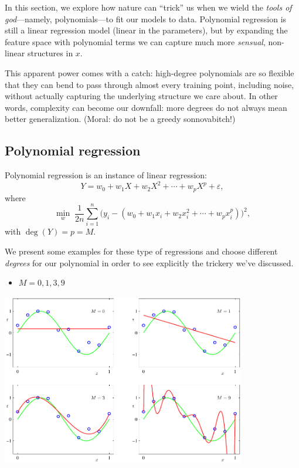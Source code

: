 In this section, we explore how nature can ``trick'' us when we wield the
\textit{tools of god}---namely, polynomials---to fit our models to data.
Polynomial regression is still a linear regression model (linear in the
parameters), but by expanding the feature space with polynomial terms we can
capture much more \textit{sensual}, non-linear structures in $x$.

\vspace{0.2cm}

This apparent power comes with a catch: high-degree polynomials are so
flexible that they can bend to pass through almost every training point,
including noise, without actually capturing the underlying structure we care
about. In other words, complexity can become our downfall: more degrees do not
always mean better generalization. (Moral: do not be a greedy sonnovabitch!)

\subsection*{Polynomial regression}
Polynomial regression is an instance of linear regression:
\[
Y = w_0 + w_1 X + w_2 X^2 + \cdots + w_p X^p + \varepsilon,
\]
where
\[
\min_{w}\;\frac{1}{2n}\sum_{i=1}^n \Big( y_i - (w_0 + w_1 x_i + w_2 x_i^2 + \cdots + w_p x_i^p) \Big)^2,
\]
with $\operatorname{deg}(Y) = p = M$.

\medskip

\noindent We present some examples for these type of regressions and choose different \textit{degrees} for our polynomial in order to see explicitly the trickery we've discussed.
\begin{itemize}
    \item $M=0,1,3,9$
\end{itemize}

\includegraphics[width=0.8\textwidth]{figures/poly_regression_examples.png}

